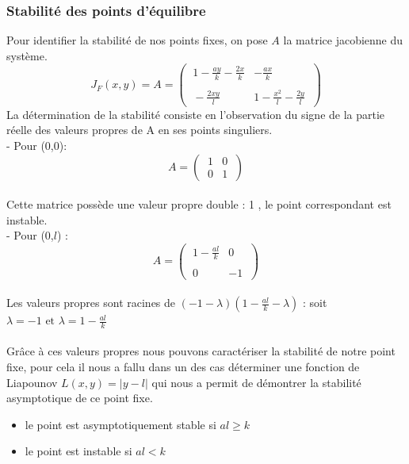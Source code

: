 \documentclass{article}
\begin{document}
\subsubsection{Stabilité des points d'équilibre}
\noindent
Pour identifier la stabilité de nos points fixes,  on pose $A$ la matrice jacobienne du système.
\begin{equation*}
    J_{F}(x,y) = A =
    \begin{pmatrix}
        \ 1- \frac{ay}{k} - \frac{2x}{k} & - \frac{ax}{k}\ \\\\
        \ - \frac{2xy}{l}  & 1 - \frac{x^{2}}{l} - \frac{2y}{l}\ 
    \end{pmatrix}
\end{equation*}
La détermination de la stabilité consiste en l'observation du signe de la partie réelle des valeurs propres de A en ses points singuliers.\\

\vfill
\noindent
- Pour (0,0):
\begin{equation*}
    A =
    \begin{pmatrix}
        \ 1 & 0 \phantom{\ }\\
        \ 0 & 1 \phantom{\ }
    \end{pmatrix}
\end{equation*}\\
Cette matrice possède une valeur propre double : 1 , le point correspondant est instable.\\

\vfill
\noindent
- Pour (0,$l$) :
\begin{equation*}
    A = 
    \begin{pmatrix}
        \ 1- \frac{al}{k}  & 0 \phantom{\ }\\\\
        \ 0  & -1 \phantom{\ }
    \end{pmatrix}
\end{equation*}\\
Les valeurs propres sont racines de $(-1 - \lambda)(1- \frac{al}{k} - \lambda)$ : soit $\lambda = -1 \text{ et } \lambda = 1 - \frac{al}{k}$\\\\
Grâce à ces valeurs propres nous pouvons caractériser la stabilité de notre point fixe, pour cela il nous a fallu dans un des cas déterminer une fonction de Liapounov $L(x,y) = |y - l|$ qui nous a permit de démontrer la stabilité asymptotique de ce point fixe.
\begin{itemize}
    \item le point est asymptotiquement stable si $al \geqslant k$
    \item le point est instable si $al < k$
\end{itemize}
\end{document}
